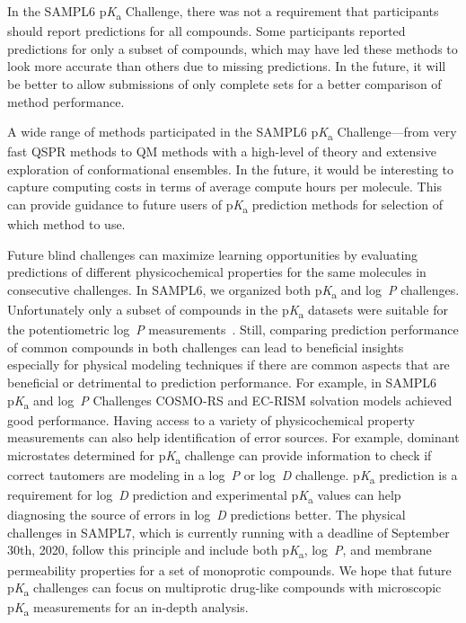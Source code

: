 \documentclass[9pt,lineno,final]{elife}
\newcommand{\pKa}{p\textit{K}\textsubscript{a}}
\newcommand{\logD}{log~\textit{D}}
\newcommand{\logP}{log~\textit{P}}
\begin{document}
In the SAMPL6 \pKa{} Challenge, there was not a requirement that participants should report predictions for all compounds. 
Some participants reported predictions for only a subset of compounds, which may have led these methods to look more accurate than others due to missing predictions.
In the future, it will be better to allow submissions of only complete sets for a better comparison of method performance. 

A wide range of methods participated in the SAMPL6 \pKa{} Challenge---from very fast QSPR methods to QM methods with a high-level of theory and extensive exploration of conformational ensembles. 
In the future, it would be interesting to capture computing costs in terms of average compute hours per molecule. 
This can provide guidance to future users of \pKa{} prediction methods for selection of which method to use.

Future blind challenges can maximize learning opportunities by evaluating predictions of different physicochemical properties for the same molecules in consecutive challenges. 
In SAMPL6, we organized both \pKa{} and \logP{} challenges. 
Unfortunately only a subset of compounds in the \pKa{} datasets were suitable for the potentiometric \logP{} measurements~\cite{Isik:2018:J.Comput.AidedMol.Des.}. 
Still, comparing prediction performance of common compounds in both challenges can lead to beneficial insights especially for physical modeling techniques if there are common aspects that are beneficial or detrimental to prediction performance. 
For example, in SAMPL6 \pKa{} and \logP{} Challenges COSMO-RS and EC-RISM solvation models achieved good performance.
Having access to a variety of physicochemical property measurements can also help identification of error sources.
For example, dominant microstates determined for \pKa{} challenge can provide information to check if correct tautomers are modeling in a \logP{} or \logD{} challenge.
\pKa{} prediction is a requirement for \logD{} prediction and experimental \pKa{} values can help diagnosing the source of errors in \logD{} predictions better. 
The physical challenges in SAMPL7, which is currently running with a deadline of September 30th, 2020, follow this principle and include both \pKa{}, \logP{}, and membrane permeability properties for a set of monoprotic compounds. 
We hope that future \pKa{} challenges can focus on multiprotic drug-like compounds with microscopic \pKa{} measurements for an in-depth analysis.



\end{document}
